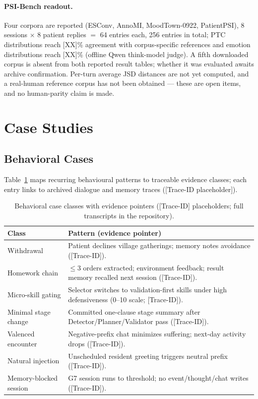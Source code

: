 \documentclass[10pt]{article}
\newcommand{\sys}{MoodTown}
\begin{document}
\paragraph{PSI-Bench readout.}
Four corpora are reported (ESConv, AnnoMI, \sys-0922, PatientPSI), 8 sessions $\times$ 8 patient replies $=$ 64 entries each, 256 entries in total; PTC distributions reach [XX]\% agreement with corpus-specific references and emotion distributions reach [XX]\% (offline Qwen think-model judge).
A fifth downloaded corpus is absent from both reported result tables; whether it was evaluated awaits archive confirmation.
Per-turn average JSD distances are not yet computed, and a real-human reference corpus has not been obtained --- these are open items, and no human-parity claim is made.

\section{Case Studies}\label{app:cases}

\subsection{Behavioral Cases}

Table~\ref{tab:cases} maps recurring behavioural patterns to traceable evidence classes; each entry links to archived dialogue and memory traces ([Trace-ID placeholder]).

\begin{table}[h]
\centering
\caption{Behavioral case classes with evidence pointers ([Trace-ID] placeholders; full transcripts in the repository).}
\label{tab:cases}
\small
\begin{tabular}{@{}lp{10.2cm}@{}}
\toprule
Class & Pattern (evidence pointer) \\
\midrule
Withdrawal & Patient declines village gatherings; memory notes avoidance ([Trace-ID]). \\
Homework chain & $\le$3 orders extracted; environment feedback; result memory recalled next session ([Trace-ID]). \\
Micro-skill gating & Selector switches to validation-first skills under high defensiveness (0--10 scale; [Trace-ID]). \\
Minimal stage change & Committed one-clause stage summary after Detector/Planner/Validator pass ([Trace-ID]). \\
Valenced encounter & Negative-prefix chat minimizes suffering; next-day activity drops ([Trace-ID]). \\
Natural injection & Unscheduled resident greeting triggers neutral prefix ([Trace-ID]). \\
Memory-blocked session & G7 session runs to threshold; no event/thought/chat writes ([Trace-ID]). \\
\bottomrule
\end{tabular}
\end{table}
\end{document}
